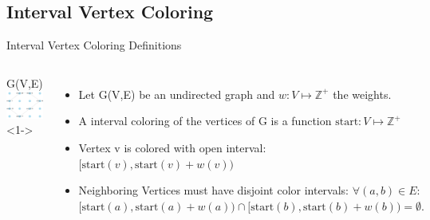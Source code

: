 \subsection*{Interval Vertex Coloring}
\begin{frame}{Interval Vertex Coloring Definitions}
  \begin{columns}
        \centering
        G(V,E) \\
        \null
        \includegraphics[width=1\textwidth]{figures/ICV0.pdf}<1-> \\

    \begin{itemize}
      \item<1-> Let G(V,E) be an undirected graph and $w : V \mapsto \mathbb{Z^+}$ the weights.
      \null
      \vfill
      \null
      \item<2-> A interval coloring of the vertices of G is a function $\text{start} : V \mapsto \mathbb{Z^+}$
      \null
      \vfill
      \null
      \item<3-> Vertex v is colored with open interval:
      $[\text{start}(v), \text{start}(v)+w(v))$
      \null
      \vfill
      \null
      \item<4-> Neighboring Vertices must have disjoint color intervals: 
      $\forall (a, b) \in E:$ \\
      $ [\text{start}(a), \text{start}(a) + w(a)) \cap [\text{start}(b), \text{start}(b) + w(b)) = \emptyset.$
      
    \end{itemize}
  \end{columns}
\end{frame}

